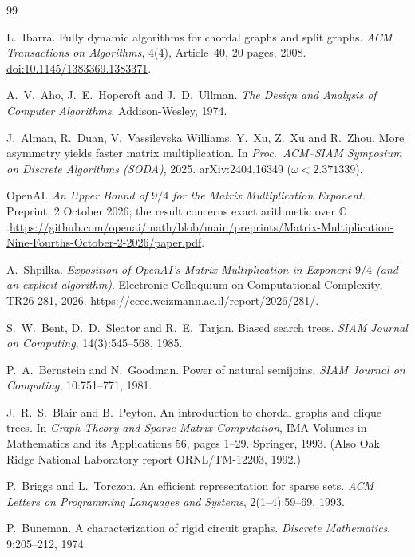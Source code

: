 \documentclass[11pt,a4paper,oneside]{report}
\theoremstyle{plain}
\theoremstyle{definition}
\theoremstyle{remark}
\begin{document}
\begin{thebibliography}{99}

 L.~Ibarra. Fully dynamic algorithms for chordal graphs and split graphs.
\emph{ACM Transactions on Algorithms}, 4(4), Article~40, 20 pages, 2008.
\href{https://doi.org/10.1145/1383369.1383371}{doi:10.1145/1383369.1383371}.

 A.~V.~Aho, J.~E.~Hopcroft and J.~D.~Ullman. \emph{The Design and Analysis of
Computer Algorithms}. Addison-Wesley, 1974.

 J.~Alman, R.~Duan, V.~Vassilevska Williams, Y.~Xu, Z.~Xu and R.~Zhou. More
asymmetry yields faster matrix multiplication. In \emph{Proc.\ ACM--SIAM Symposium on Discrete
Algorithms (SODA)}, 2025. arXiv:2404.16349 (\(\omega<2.371339\)).

 OpenAI. \emph{An Upper Bound of $9/4$ for the Matrix Multiplication Exponent}. Preprint, 2 October 2026; the result concerns exact arithmetic over $\mathbb{C}$.\newline\url{https://github.com/openai/math/blob/main/preprints/Matrix-Multiplication-Nine-Fourths-October-2-2026/paper.pdf}.

 A.~Shpilka. \emph{Exposition of OpenAI's Matrix Multiplication in Exponent $9/4$ (and an explicit algorithm)}. Electronic Colloquium on Computational Complexity, TR26-281, 2026. \url{https://eccc.weizmann.ac.il/report/2026/281/}.

 S.~W.~Bent, D.~D.~Sleator and R.~E.~Tarjan. Biased search trees.
\emph{SIAM Journal on Computing}, 14(3):545--568, 1985.

 P.~A.~Bernstein and N.~Goodman. Power of natural semijoins.
\emph{SIAM Journal on Computing}, 10:751--771, 1981.

 J.~R.~S.~Blair and B.~Peyton. An introduction to chordal graphs and clique
trees. In \emph{Graph Theory and Sparse Matrix Computation}, IMA Volumes in Mathematics and its
Applications 56, pages 1--29. Springer, 1993. (Also Oak Ridge National Laboratory report
ORNL/TM-12203, 1992.)

 P.~Briggs and L.~Torczon. An efficient representation for sparse sets.
\emph{ACM Letters on Programming Languages and Systems}, 2(1--4):59--69, 1993.

 P.~Buneman. A characterization of rigid circuit graphs.
\emph{Discrete Mathematics}, 9:205--212, 1974.


\end{thebibliography}
\end{document}
